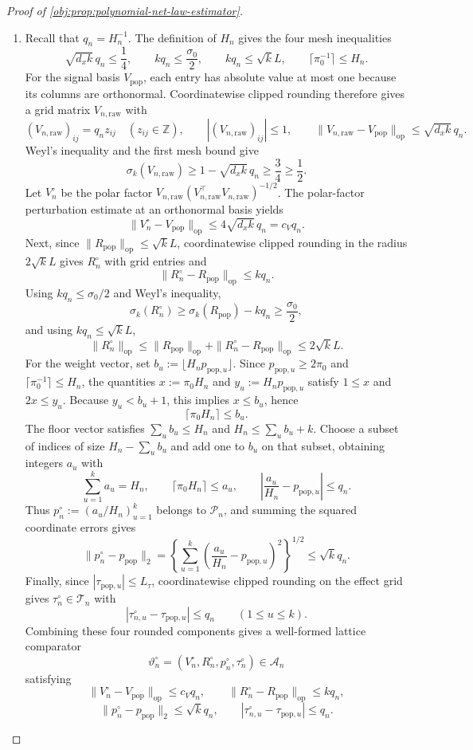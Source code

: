 \documentclass[11pt]{article}
\begin{document}
\begin{proof}[Proof of \cref{obj:prop:polynomial-net-law-estimator}]
\begin{enumerate}
\item Recall that \(q_n=H_n^{-1}\).  The definition of \(H_n\) gives the four mesh inequalities
\[
\sqrt{d_xk}\,q_n\le\frac14,
\qquad
kq_n\le\frac{\sigma_0}{2},
\qquad
kq_n\le\sqrt{k}L,
\qquad
\lceil\pi_0^{-1}\rceil\le H_n .
\]
For the signal basis \(V_{\mathrm{pop}}\), each entry has absolute value at most one because its columns are orthonormal.  Coordinatewise clipped rounding therefore gives a grid matrix \(V_{n,\mathrm{raw}}\) with
\[
(V_{n,\mathrm{raw}})_{ij}=q_n z_{ij}\quad (z_{ij}\in\mathbb Z),
\qquad |(V_{n,\mathrm{raw}})_{ij}|\le1,
\qquad
\|V_{n,\mathrm{raw}}-V_{\mathrm{pop}}\|_{\mathrm{op}}
\le \sqrt{d_xk}\,q_n .
\]
Weyl's inequality and the first mesh bound give
\[
\sigma_k(V_{n,\mathrm{raw}})\ge1-\sqrt{d_xk}\,q_n\ge\frac34\ge\frac12 .
\]
Let \(V_n^\circ\) be the polar factor \(V_{n,\mathrm{raw}}(V_{n,\mathrm{raw}}^\top V_{n,\mathrm{raw}})^{-1/2}\).  The polar-factor perturbation estimate at an orthonormal basis yields
\[
\|V_n^\circ-V_{\mathrm{pop}}\|_{\mathrm{op}}
\le4\sqrt{d_xk}\,q_n=c_Vq_n .
\]
Next, since \(\|R_{\mathrm{pop}}\|_{\mathrm{op}}\le\sqrt{k}L\), coordinatewise clipped rounding in the radius \(2\sqrt{k}L\) gives \(R_n^\circ\) with grid entries and
\[
\|R_n^\circ-R_{\mathrm{pop}}\|_{\mathrm{op}}\le kq_n .
\]
Using \(kq_n\le\sigma_0/2\) and Weyl's inequality,
\[
\sigma_k(R_n^\circ)\ge\sigma_k(R_{\mathrm{pop}})-kq_n
\ge\frac{\sigma_0}{2},
\]
and using \(kq_n\le\sqrt{k}L\),
\[
\|R_n^\circ\|_{\mathrm{op}}
\le \|R_{\mathrm{pop}}\|_{\mathrm{op}}+\|R_n^\circ-R_{\mathrm{pop}}\|_{\mathrm{op}}
\le2\sqrt{k}L .
\]
For the weight vector, set \(b_u:=\lfloor H_np_{\mathrm{pop},u}\rfloor\).  Since \(p_{\mathrm{pop},u}\ge2\pi_0\) and \(\lceil\pi_0^{-1}\rceil\le H_n\), the quantities \(x:=\pi_0H_n\) and \(y_u:=H_np_{\mathrm{pop},u}\) satisfy \(1\le x\) and \(2x\le y_u\).  Because \(y_u< b_u+1\), this implies \(x\le b_u\), hence
\[
\lceil\pi_0H_n\rceil\le b_u .
\]
The floor vector satisfies \(\sum_u b_u\le H_n\) and \(H_n\le\sum_u b_u+k\).  Choose a subset of indices of size \(H_n-\sum_u b_u\) and add one to \(b_u\) on that subset, obtaining integers \(a_u\) with
\[
\sum_{u=1}^k a_u=H_n,
\qquad
\lceil\pi_0H_n\rceil\le a_u,
\qquad
\left|\frac{a_u}{H_n}-p_{\mathrm{pop},u}\right|\le q_n .
\]
Thus \(p_n^\circ:=(a_u/H_n)_{u=1}^k\) belongs to \(\mathcal P_n\), and summing the squared coordinate errors gives
\[
\|p_n^\circ-p_{\mathrm{pop}}\|_2
=\left\{\sum_{u=1}^k\left(\frac{a_u}{H_n}-p_{\mathrm{pop},u}\right)^2\right\}^{1/2}
\le\sqrt{k}q_n .
\]
Finally, since \(|\tau_{\mathrm{pop},u}|\le L_\tau\), coordinatewise clipped rounding on the effect grid gives \(\tau_n^\circ\in\mathcal T_n\) with
\[
|\tau_{n,u}^\circ-\tau_{\mathrm{pop},u}|\le q_n
\qquad(1\le u\le k).
\]
Combining these four rounded components gives a well-formed lattice comparator
\[
\vartheta_n^\circ=(V_n^\circ,R_n^\circ,p_n^\circ,\tau_n^\circ)\in\mathcal A_n
\]
satisfying
\[
\|V_n^\circ-V_{\mathrm{pop}}\|_{\mathrm{op}}\le c_Vq_n,\qquad
\|R_n^\circ-R_{\mathrm{pop}}\|_{\mathrm{op}}\le kq_n,
\]
\[
\|p_n^\circ-p_{\mathrm{pop}}\|_2\le\sqrt{k}q_n,\qquad
|\tau_{n,u}^\circ-\tau_{\mathrm{pop},u}|\le q_n .
\] %


\end{enumerate}
\end{proof}
\end{document}
